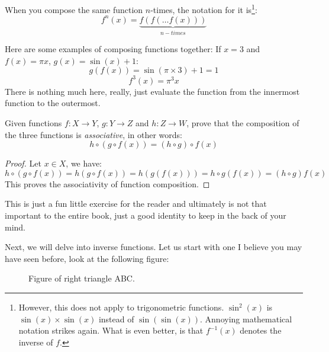 When you compose the same function \(n\)-times, the notation for it is\footnote{However, this does not apply to trigonometric functions. \(\sin^2(x)\) is \(\sin(x) \times \sin(x)\) instead of \(\sin(\sin(x))\). Annoying mathematical notation strikes again. What is even better, is that \(f^{-1}(x)\) denotes the inverse of \(f\).}:
\begin{equation*}
  f^n(x)=\underbrace{f(f(\ldots f(x)))}_{n-times} 
\end{equation*}

\begin{example}
  Here are some examples of composing functions together:
  If \(x=3\) and \(f(x)=\pi x\), \(g(x)=\sin(x)+1\):
  \begin{equation}
    g(f(x))=\sin(\pi \times 3)+1=1 
  \end{equation}
  \begin{equation}
    f^3(x)=\pi^{3}x 
  \end{equation}
  There is nothing much here, really, just evaluate the function from the innermost function to the outermost.
\end{example}
\begin{theorem}
  Given functions \(f:X \to Y\), \(g: Y \to Z\) and \(h: Z \to W\), prove that the composition of the three functions is \textit{associative}, in other words:
  \begin{equation*}
    h \circ (g \circ f(x)) = (h \circ g) \circ f(x)
  \end{equation*}
\end{theorem}
\begin{proof}
  Let \(x \in X\), we have: 
  \begin{equation*}
    h \circ (g \circ f(x)) = h(g \circ f(x)) = h(g(f(x))) = h \circ g(f(x)) = (h \circ g)f(x)
  \end{equation*}
  This proves the associativity of function composition.
\end{proof}
\begin{remark}
  This is just a fun little exercise for the reader and ultimately is not that important to the entire book, just a good identity to keep in the back of your mind. 
\end{remark}

Next, we will delve into inverse functions. Let us start with one I believe you may have seen before, look at the following figure: 

\begin{figure}[h]
  \centering
  \caption{Figure of right triangle ABC.}
\end{figure}

